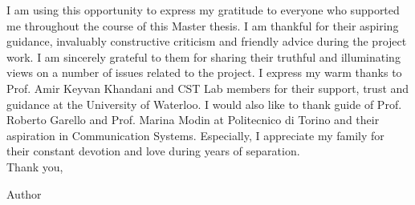 \documentclass[12pt,oneside,cucitura]{toptesi}
\begin{document}
\ringraziamenti
I am using this opportunity to express my gratitude to everyone who supported me throughout the course of this Master thesis. I am thankful for their aspiring guidance, invaluably constructive criticism and friendly advice during the project work. I am sincerely grateful to them for sharing their truthful and illuminating views on a number of issues related to the project.
I express my warm thanks to Prof. Amir Keyvan Khandani and CST Lab members for their support, trust and guidance at the University of Waterloo.
I would also like to thank guide of Prof. Roberto Garello and Prof. Marina Modin at Politecnico di Torino and their aspiration in Communication Systems.
Especially, I appreciate my family for their constant devotion and love during years of separation.\\

Thank you,

Author

\tablespagetrue\figurespagetrue %

\indici

\mainmatter









\cleardoublepage


	



\end{document}
